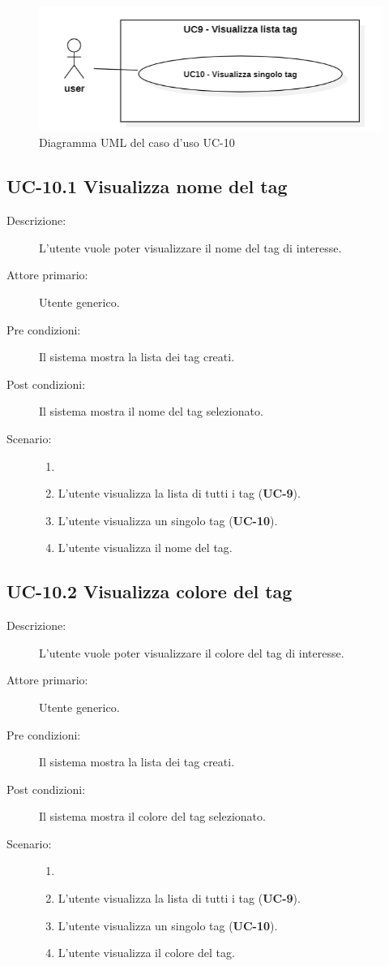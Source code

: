 \begin{figure}[H]
    \centering
    \includegraphics[width=0.8\linewidth]{UC10.png}
    \caption{Diagramma UML del caso d'uso UC-10}
    \label{fig:UC10}
\end{figure}
\subsection{UC-10.1 Visualizza nome del tag}
\begin{description}
    \item[Descrizione:] L’utente vuole poter visualizzare il nome del tag di interesse.
    \item[Attore primario:] Utente generico.
    \item[Pre condizioni:] Il sistema mostra la lista dei tag creati.
    \item[Post condizioni:] Il sistema mostra il nome del tag selezionato.
    \item[Scenario:]
    \begin{enumerate}
        \item[]
        \item L’utente visualizza la lista di tutti i tag (\textbf{UC-9}).
        \item L'utente visualizza un singolo tag (\textbf{UC-10}).
        \item L'utente visualizza il nome del tag.
    \end{enumerate}
\end{description}

\subsection{UC-10.2 Visualizza colore del tag}
\begin{description}
    \item[Descrizione:] L’utente vuole poter visualizzare il colore del tag di interesse.
    \item[Attore primario:] Utente generico.
    \item[Pre condizioni:] Il sistema mostra la lista dei tag creati.
    \item[Post condizioni:] Il sistema mostra il colore del tag selezionato.
    \item[Scenario:] 
    \begin{enumerate}
        \item[]
        \item L’utente visualizza la lista di tutti i tag (\textbf{UC-9}).
        \item L'utente visualizza un singolo tag (\textbf{UC-10}).
        \item L'utente visualizza il colore del tag.
    \end{enumerate}
\end{description}


